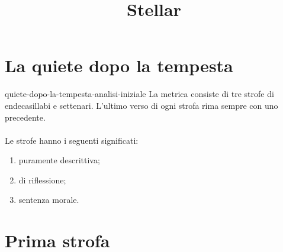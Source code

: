 \documentclass[preview]{standalone}
\begin{document}
\title{Stellar}
\genpage

\section{La quiete dopo la tempesta}

\begin{snippet}{quiete-dopo-la-tempesta-analisi-iniziale}
    La metrica consiste di tre strofe di endecasillabi e settenari.
    L'ultimo verso di ogni strofa rima sempre con uno precedente.
    \\\\
    Le strofe hanno i seguenti significati:
    \begin{enumerate}
        \item puramente descrittiva;
        \item di riflessione;
        \item sentenza morale.
    \end{enumerate}
\end{snippet}

\section{Prima strofa}
\end{document}
